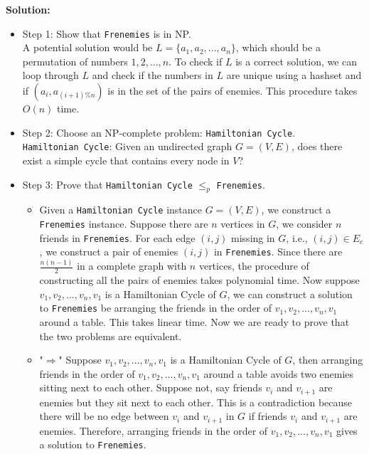 \documentclass{article}
\begin{document}
\begin{tcolorbox}
{\bf Solution:} 
\begin{itemize}
\item Step 1: Show that \texttt{Frenemies} is in NP.\\
A potential solution would be $L = \{a_1, a_2, ..., a_n\}$, which should be a permutation of numbers $1,2, ..., n$.  To check if $L$ is a correct solution, we can loop through $L$ and check if the numbers in $L$ are unique using a hashset and if $(a_i, a_{(i+1)\%n})$ is in the set of the pairs of enemies. This procedure takes $O(n)$ time.

\item Step 2: Choose an NP-complete problem: \texttt{Hamiltonian Cycle}.\\
\texttt{Hamiltonian Cycle}: Given an undirected graph $G = (V, E)$, does there exist a simple cycle that contains every node in $V$?

\item Step 3: Prove that \texttt{Hamiltonian Cycle} $\leq _{p}$ \texttt{Frenemies}.
\begin{itemize}
\item Given a \texttt{Hamiltonian Cycle} instance $G = (V, E)$, we construct a \texttt{Frenemies} instance. Suppose there are $n$ vertices in $G$, we consider $n$ friends in \texttt{Frenemies}. For each edge $(i,j)$ missing in $G$, i.e.,  $(i,j) \in E_c$, we construct a pair of enemies $(i, j)$ in \texttt{Frenemies}. Since there are $\frac {n(n-1)}{2}$ in a complete graph with $n$ vertices, the procedure of constructing all the pairs of enemies takes polynomial time. Now suppose $v_1, v_2, ..., v_n, v_1$ is a Hamiltonian Cycle of $G$, we can construct a solution to \texttt{Frenemies} be arranging the friends in the order of $v_1, v_2, ..., v_n, v_1$ around a table. This takes linear time. Now we are ready to prove that the two problems are equivalent. 

\item "$\Rightarrow$" Suppose $v_1, v_2, ..., v_n, v_1$ is a Hamiltonian Cycle of $G$, then arranging friends in the order of $v_1, v_2, ..., v_n, v_1$ around a table avoids two enemies sitting next to each other. Suppose not, say friends $v_{i}$ and $v_{i+1}$ are enemies but they sit next to each other. This is a contradiction because there will be no edge between $v_i$ and $v_{i+1}$ in $G$ if friends $v_i$ and $v_{i+1}$  are enemies. Therefore, arranging friends in the order of $v_1, v_2, ..., v_n, v_1$ gives a solution to \texttt{Frenemies}.


\end{itemize}
\end{itemize}
\end{tcolorbox}
\end{document}
